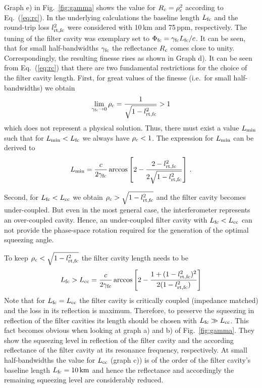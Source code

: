 Graph e) in Fig.~\ref{fig:gamma} shows the value for $R_{\rm
c}=\rho_{\rm c}^2$ according to Eq.~(\ref{eq:rc}). In the
underlying calculations the baseline length $L_{\rm fc}$ and the
round-trip loss $l_{\rm rt,fc}^2$ were considered with 10\,km and
75\,ppm, respectively.  The tuning of the filter cavity was
exemplary set to $\Phi_{\rm fc}=\gamma_{\rm fc}L_{\rm fc}/c$. It
can be seen, that for small half-bandwidths $\gamma_{\rm fc}$ the
reflectance  $R_{\rm c}$ comes close to unity.  Correspondingly,
the resulting finesse rises as shown in Graph d). It can be seen
from Eq.~(\ref{eq:rc}) that there are two fundamental restrictions
for the choice of the filter cavity length. First, for great
values of the finesse (i.e.\ for small half-bandwidths) we obtain
\begin{equation}
\lim_{\gamma_{\rm fc} \to 0} \rho_{\rm c} = \frac{1}{\sqrt{1-l_{\rm rt,fc}^2}}> 1
\end{equation}
which does not represent a physical solution. Thus, there must
exist a value $L_{\rm min}$ such that for $L_{\rm min} < L_{\rm
fc}$ we always have $\rho_{\rm c}<1$. The expression for $L_{\rm
min}$ can be derived to
\begin{equation}
L_{\rm{min}} =
\frac{c}{2\gamma_{\rm{fc}}}\arccos\left[2-\frac{2-l_{\rm{rt,fc}}^2}{2\sqrt{1-l_{\rm{rt,fc}}^2}}\right]\,.
\end{equation}

Second, for $L_{\rm fc} < L_{\rm cc}$ we obtain $\rho_{\rm
c}>\sqrt{1-l_{\rm rt,fc}^2}$ and the filter cavity becomes
under-coupled. But even in the most general case, the
interferometer represents an over-coupled cavity. Hence, an
under-coupled filter cavity with $L_{\rm fc} < L_{\rm cc}$ can not
provide the phase-space rotation required for the generation of
the optimal squeezing angle.

To keep  $\rho_{\rm c}<\sqrt{1-l_{\rm rt,fc}^2}$ the filter cavity length needs to be
\begin{equation}
L_{\rm fc} > L_{\rm cc} =
\frac{c}{2\gamma_{\rm{fc}}}\arccos\left[2-\frac{1+(1-l_{\rm
rt,fc}^2)^2}{2(1-l_{\rm rt,fc}^2)}\right]\label{eq:lcc}
\end{equation}
Note that for $L_{\rm fc}=L_{\rm cc}$ the filter cavity is
critically coupled (impedance matched) and the loss in its
reflection is maximum. Therefore, to preserve the squeezing in
reflection of the filter cavities its length should be chosen with
$L_{\rm fc} \gg L_{\rm cc}$. This fact becomes obvious when
looking at graph a) and b) of Fig.~\ref{fig:gamma}. They show the
squeezing level in reflection of the filter cavity and the according reflectance of the filter cavity at its resonance frequency, respectively. At small half-bandwidths the
value for $L_{\rm cc}$ (graph c)) is of the order of the filter
cavity's baseline length $L_{\rm fc}=10\,{\rm km}$ and hence the reflectance
and accordingly the remaining squeezing level are considerably
reduced.


